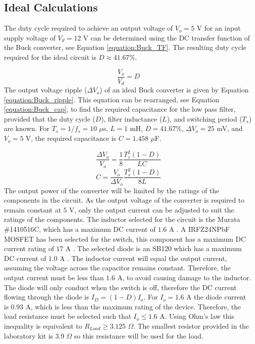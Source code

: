 \documentclass[12pt,twoside]{scrartcl}
\begin{document}
\subsection{Ideal Calculations}
The duty cycle required to achieve an output voltage of $V_{o} = 5$ V for an input supply voltage of $V_{d} = 12$ V can be determined using the DC transfer function of the Buck converter, see Equation \ref{equation:Buck_TF}. The resulting duty cycle required for the ideal circuit is $D \approx 41.67$\%.\par
\begin{equation}
\frac{V_o}{V_d} = D \label{equation:Buck_TF}
\end{equation}
The output voltage ripple ($\Delta V_o$) of an ideal Buck converter is given by Equation \ref{equation:Buck_ripple}. This equation can be rearranged, see Equation \ref{equation:Buck_cap}, to find the required capacitance for the low pass filter, provided that the duty cycle ($D$), filter inductance ($L$), and switching period ($T_{s}$) are known. For $T_{s} = 1/f_{s} = 10$ $\mu$s, $L = 1$ mH, $D = 41.67$\%, $\Delta V_{o} = 25$ mV, and $V_o = 5$ V, the required capacitance is $C = 1.458$ $\mu$F. \par
\begin{equation}
\frac{\Delta V_{o}}{V_{o}} = \frac{1}{8}\frac{T_{s}^{2}(1-D)}{LC} \label{equation:Buck_ripple}
\end{equation}
\begin{equation}
C = \frac{V_o}{\Delta V_{o}}\frac{T_{s}^{2}(1-D)}{8L} \label{equation:Buck_cap}
\end{equation}
The output power of the converter will be limited by the ratings of the components in the circuit. As the output voltage of the converter is required to remain constant at $5$ V, only the output current can be adjusted to suit the ratings of the components. The inductor selected for the circuit is the Murata \#1410516C, which has a maximum DC current of $1.6$ A \cite{RN1}. A IRFZ24NPbF MOSFET has been selected for the switch, this component has a maximum DC current rating of $17$ A \cite{RN3}. The selected diode is an SB120 which has a maximum DC current of $1.0$ A \cite{RN4}. The inductor current will equal the output current, assuming the voltage across the capacitor remains constant. Therefore, the output current must be less than $1.6$ A, to avoid causing damage to the inductor. The diode will only conduct when the switch is off, therefore the DC current flowing through the diode is $I_{D} = (1-D)I_{o}$. For $I_{o} = 1.6$ A the diode current is $0.93$ A, which is less than the maximum rating of the device. Therefore, the load resistance must be selected such that $I_{o} \le 1.6$ A. Using Ohm’s law this inequality is equivalent to $R_{Load} \ge 3.125$ $\Omega$. The smallest resistor provided in the laboratory kit is $3.9$ $\Omega$ so this resistance will be used for the load.\par
\end{document}
